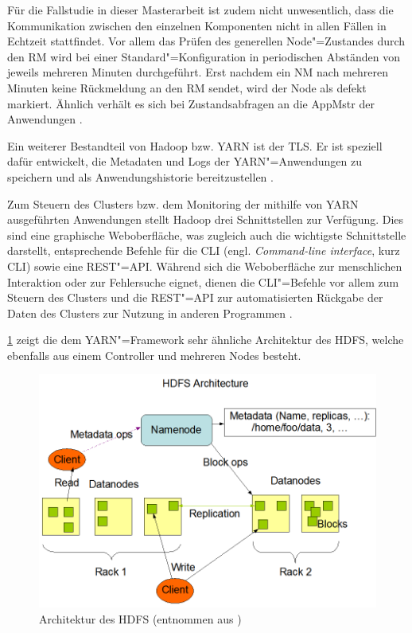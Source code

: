 Für die Fallstudie in dieser Masterarbeit ist zudem nicht unwesentlich, dass die Kommunikation zwischen den einzelnen Komponenten nicht in allen Fällen in Echtzeit stattfindet.
Vor allem das Prüfen des generellen Node"=Zustandes durch den \gls{RM} wird bei einer Standard"=Konfiguration in periodischen Abständen von jeweils mehreren Minuten durchgeführt.
Erst nachdem ein \gls{NM} nach mehreren Minuten keine Rückmeldung an den \gls{RM} sendet, wird der Node als defekt markiert.
Ähnlich verhält es sich bei Zustandsabfragen an die \gls{AppMstr} der Anwendungen \cite{HadoopYarnConfig271}.

Ein weiterer Bestandteil von Hadoop bzw. YARN ist der \gls{TLS}.
Er ist speziell dafür entwickelt, die Metadaten und Logs der YARN"=Anwendungen zu speichern und als Anwendungshistorie bereitzustellen \cite{HadoopYarnTlServer271}.

Zum Steuern des Clusters bzw. dem Monitoring der mithilfe von YARN ausgeführten Anwendungen stellt Hadoop drei Schnittstellen zur Verfügung.
Dies sind eine graphische Weboberfläche, was zugleich auch die wichtigste Schnittstelle darstellt, entsprechende Befehle für die \acrlong{CLI} (engl. \emph{Command-line interface}, kurz \acrshort{CLI}) sowie eine REST"=API.
Während sich die Weboberfläche zur menschlichen Interaktion oder zur Fehlersuche eignet, dienen die \gls{CLI}"=Befehle vor allem zum Steuern des Clusters und die REST"=API \uA zur automatisierten Rückgabe der Daten des Clusters zur Nutzung in anderen Programmen \cite{HadoopClusterSetup271,HadoopYarnCmds271,HadoopRmApi271,HadoopNmApi271}.

\cref{fig:hdfsarch} zeigt die dem YARN"=Framework sehr ähnliche Architektur des HDFS, welche ebenfalls aus einem Controller und mehreren Nodes besteht.

\begin{figure}
    \includegraphics{./resources/hdfsarchitecture.png}
    \caption[Architektur des HDFS]
    {Architektur des HDFS (entnommen aus \cite{HadoopHdfsDesc271})}
    \label{fig:hdfsarch}
\end{figure}

